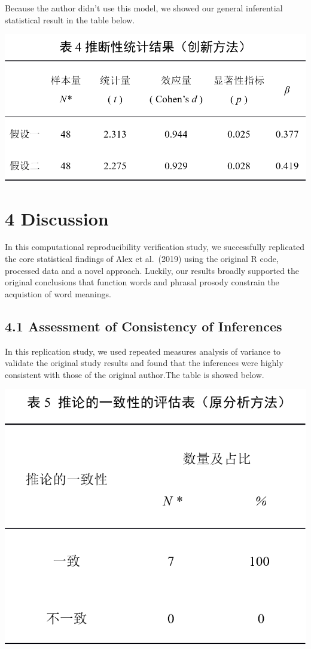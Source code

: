 \documentclass[
  man]{apa6}
\begin{document}
Because the author didn't use this model, we showed our general inferential statistical result in the table below.

\includegraphics{pic/table_4.png}

\section{4 Discussion}\label{discussion}

In this computational reproducibility verification study, we successfully replicated the core statistical findings of Alex et al.~(2019) using the original R code, processed data and a novel approach. Luckily, our results broadly supported the original conclusions that function words and phrasal prosody constrain the acquistion of word meanings.

\subsection{4.1 Assessment of Consistency of Inferences}\label{assessment-of-consistency-of-inferences}

In this replication study, we used repeated measures analysis of variance to validate the original study results and found that the inferences were highly consistent with those of the original author.The table is showed below.

\includegraphics{pic/table_5.png}
\end{document}
